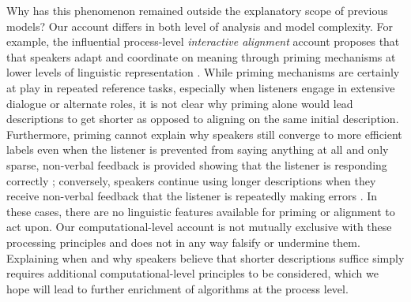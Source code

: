 Why has this phenomenon remained outside the explanatory scope of previous models?
Our account differs in both level of analysis and model complexity.
For example, the influential process-level \emph{interactive alignment} account proposes that that speakers adapt and coordinate on meaning through priming mechanisms at lower levels of linguistic representation  \cite{pickering2004toward, pickering2006alignment, garrod2009joint}.
While priming mechanisms are certainly at play in repeated reference tasks, especially when listeners engage in extensive dialogue or alternate roles, it is not clear why priming alone would lead descriptions to get shorter as opposed to aligning on the same initial description.
Furthermore, priming cannot explain why speakers still converge to more efficient labels even when the listener is prevented from saying anything at all and only sparse, non-verbal feedback is provided showing that the listener is responding correctly \cite{KraussWeinheimer66_Tangrams}; conversely, speakers continue using longer descriptions when they receive non-verbal feedback that the listener is repeatedly making errors \cite<see also>{hawkins2020characterizing}.
In these cases, there are no linguistic features available for priming or alignment to act upon.
Our computational-level account is not mutually exclusive with these processing principles and does not in any way falsify or undermine them.
Explaining when and why speakers believe that shorter descriptions suffice simply requires additional computational-level principles to be considered, which we hope will lead to further enrichment of algorithms at the process level.

